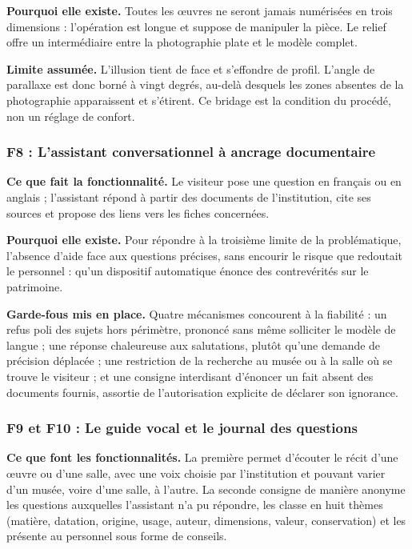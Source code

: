 \textbf{Pourquoi elle existe.} Toutes les œuvres ne seront jamais numérisées en
trois dimensions : l'opération est longue et suppose de manipuler la pièce. Le
relief offre un intermédiaire entre la photographie plate et le modèle complet.

\textbf{Limite assumée.} L'illusion tient de face et s'effondre de profil.
L'angle de parallaxe est donc borné à vingt degrés, au-delà desquels les zones
absentes de la photographie apparaissent et s'étirent. Ce bridage est la
condition du procédé, non un réglage de confort.

\subsubsection{F8 : L'assistant conversationnel à ancrage documentaire}

\textbf{Ce que fait la fonctionnalité.} Le visiteur pose une question en
français ou en anglais ; l'assistant répond à partir des documents de
l'institution, cite ses sources et propose des liens vers les fiches concernées.

\textbf{Pourquoi elle existe.} Pour répondre à la troisième limite de la
problématique, l'absence d'aide face aux questions précises, sans encourir le
risque que redoutait le personnel : qu'un dispositif automatique énonce des
contrevérités sur le patrimoine.

\textbf{Garde-fous mis en place.} Quatre mécanismes concourent à la fiabilité :
un refus poli des sujets hors périmètre, prononcé sans même solliciter le modèle
de langue ; une réponse chaleureuse aux salutations, plutôt qu'une demande de
précision déplacée ; une restriction de la recherche au musée ou à la salle où
se trouve le visiteur ; et une consigne interdisant d'énoncer un fait absent des
documents fournis, assortie de l'autorisation explicite de déclarer son
ignorance.

\subsubsection{F9 et F10 : Le guide vocal et le journal des questions}

\textbf{Ce que font les fonctionnalités.} La première permet d'écouter le récit
d'une œuvre ou d'une salle, avec une voix choisie par l'institution et pouvant
varier d'un musée, voire d'une salle, à l'autre. La seconde consigne de manière
anonyme les questions auxquelles l'assistant n'a pu répondre, les classe en huit
thèmes (matière, datation, origine, usage, auteur, dimensions, valeur,
conservation) et les présente au personnel sous forme de conseils.

